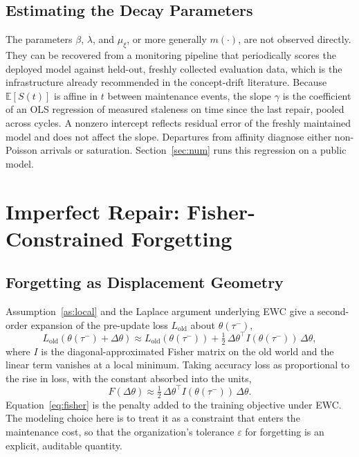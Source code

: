 \documentclass[journal]{IEEEtran}
\newcommand{\E}{\mathbb{E}}
\newcommand{\eps}{\varepsilon}
\begin{document}
\subsection{Estimating the Decay Parameters}\label{sec:est}
The parameters $\beta$, $\lambda$, and $\mu_\xi$, or more generally $m(\cdot)$, are not observed directly. They can be recovered from a monitoring pipeline that periodically scores the deployed model against held-out, freshly collected evaluation data, which is the infrastructure already recommended in the concept-drift literature. Because $\E[S(t)]$ is affine in $t$ between maintenance events, the slope $\gamma$ is the coefficient of an OLS regression of measured staleness on time since the last repair, pooled across cycles. A nonzero intercept reflects residual error of the freshly maintained model and does not affect the slope. Departures from affinity diagnose either non-Poisson arrivals or saturation. Section~\ref{sec:num} runs this regression on a public model.

\section{Imperfect Repair: Fisher-Constrained Forgetting}\label{sec:imperfect}
\subsection{Forgetting as Displacement Geometry}
Assumption~\ref{as:local} and the Laplace argument underlying EWC give a second-order expansion of the pre-update loss $L_{\mathrm{old}}$ about $\theta(\tau^-)$,
\begin{equation}
L_{\mathrm{old}}(\theta(\tau^-)+\Delta\theta)\approx L_{\mathrm{old}}(\theta(\tau^-))+\tfrac12\,\Delta\theta^{\!\top} I(\theta(\tau^-))\,\Delta\theta,
\end{equation}
where $I$ is the diagonal-approximated Fisher matrix on the old world and the linear term vanishes at a local minimum. Taking accuracy loss as proportional to the rise in loss, with the constant absorbed into the units,
\begin{equation}
F(\Delta\theta)\approx\tfrac12\,\Delta\theta^{\!\top} I(\theta(\tau^-))\,\Delta\theta.
\label{eq:fisher}
\end{equation}
Equation~\eqref{eq:fisher} is the penalty added to the training objective under EWC. The modeling choice here is to treat it as a constraint that enters the maintenance cost, so that the organization's tolerance $\eps$ for forgetting is an explicit, auditable quantity.
\end{document}
